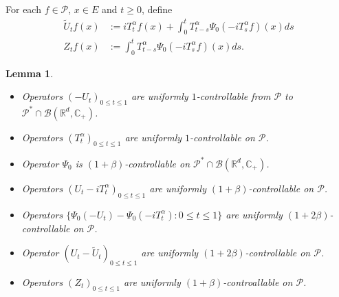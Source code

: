 \documentclass[12pt,oneside,english]{amsart}
\theoremstyle{plain}
\newtheorem{lem}[thm]{Lemma}
\theoremstyle{definition}
\numberwithin{equation}{section}
\newcommand{\added}[1]{{\color{blue}#1}}\newcommand{\deleted}[1]{{\color{red}#1}}
\begin{document}
\subsection{}
\added{
    For each $f \in \mathcal{P}$, $x\in E$ and $t\geq 0$, define
\begin{align}
\label{eq: def of Zf}
    \tilde U_t f(x)
    &:= i T^\alpha_t f(x) + \int_0^t T^\alpha_{t-s} \Psi_0(-i T_s^{\alpha}f)(x)ds
    \\Z_t f (x)
    &:= \int_0^t T^\alpha_{t-s} \Psi_0(-i T_s^{\alpha}f)(x)ds.
\end{align}
}
\added{
\begin{lem}
\label{lem: upper bound for usgx}
$~$
\begin{itemize}
\item[(1)]
    Operators $(-U_t)_{0\leq t\leq 1}$ are uniformly $1$-controllable from $\mathcal P$ to $\mathcal P^*\cap \mathcal B(\mathbb R^d, \mathbb C_+)$.
\item[(2)]
    Operators $(T^\alpha_t)_{0\leq t\leq 1}$ are uniformly $1$-controllable on $\mathcal P$.
\item[(3)]
    Operator $\Psi_0$ is $(1+\beta)$-controllable on $\mathcal P^* \cap \mathcal B(\mathbb R^d, \mathbb C_+)$.
\item[(4)]
    Operators $(U_t- iT_t^{\alpha})_{0\leq t\leq 1}$ are uniformly $(1+\beta)$-controllable on $\mathcal P$.
\item[(5)]
    Operators $\{\Psi_0(-U_t) - \Psi_0(-iT_t^\alpha): 0\leq t\leq 1\}$ are uniformly $(1+2\beta)$-controllable on $\mathcal P$.
\item[(6)]
    Operator $(U_t-\tilde U_t)_{0\leq t\leq 1}$ are uniformly $(1+2\beta)$-controllable on $\mathcal P$.
\item[(7)]
    Operators $(Z_t)_{0\leq t\leq 1}$ are uniformly $(1+\beta)$-controallable on $\mathcal P$.
\end{itemize}
\end{lem}
}
\end{document}

